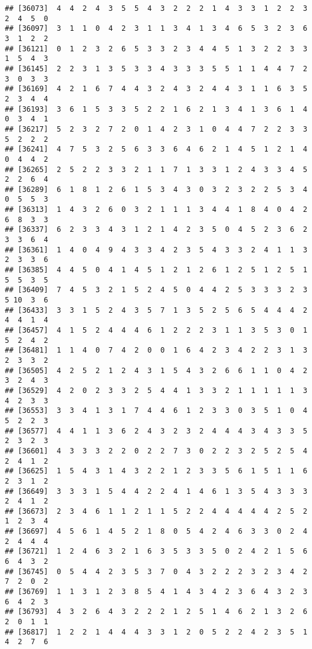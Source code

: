 \documentclass[
]{article}
\begin{document}
\begin{verbatim}
## [36073]  4  4  2  4  3  5  5  4  3  2  2  2  1  4  3  3  1  2  2  3  2  4  5  0
## [36097]  3  1  1  0  4  2  3  1  1  3  4  1  3  4  6  5  3  2  3  6  3  1  2  2
## [36121]  0  1  2  3  2  6  5  3  3  2  3  4  4  5  1  3  2  2  3  3  1  5  4  3
## [36145]  2  2  3  1  3  5  3  3  4  3  3  3  5  5  1  1  4  4  7  2  3  0  3  3
## [36169]  4  2  1  6  7  4  4  3  2  4  3  2  4  4  3  1  1  6  3  5  2  3  4  4
## [36193]  3  6  1  5  3  3  5  2  2  1  6  2  1  3  4  1  3  6  1  4  0  3  4  1
## [36217]  5  2  3  2  7  2  0  1  4  2  3  1  0  4  4  7  2  2  3  3  5  2  2  2
## [36241]  4  7  5  3  2  5  6  3  3  6  4  6  2  1  4  5  1  2  1  4  0  4  4  2
## [36265]  2  5  2  2  3  3  2  1  1  7  1  3  3  1  2  4  3  3  4  5  2  2  6  4
## [36289]  6  1  8  1  2  6  1  5  3  4  3  0  3  2  3  2  2  5  3  4  0  5  5  3
## [36313]  1  4  3  2  6  0  3  2  1  1  1  3  4  4  1  8  4  0  4  2  6  8  3  3
## [36337]  6  2  3  3  4  3  1  2  1  4  2  3  5  0  4  5  2  3  6  2  3  3  6  4
## [36361]  1  4  0  4  9  4  3  3  4  2  3  5  4  3  3  2  4  1  1  3  2  3  3  6
## [36385]  4  4  5  0  4  1  4  5  1  2  1  2  6  1  2  5  1  2  5  1  5  5  3  5
## [36409]  7  4  5  3  2  1  5  2  4  5  0  4  4  2  5  3  3  3  2  3  5 10  3  6
## [36433]  3  3  1  5  2  4  3  5  7  1  3  5  2  5  6  5  4  4  4  2  4  4  1  4
## [36457]  4  1  5  2  4  4  4  6  1  2  2  2  3  1  1  3  5  3  0  1  5  2  4  2
## [36481]  1  1  4  0  7  4  2  0  0  1  6  4  2  3  4  2  2  3  1  3  2  3  3  2
## [36505]  4  2  5  2  1  2  4  3  1  5  4  3  2  6  6  1  1  0  4  2  3  2  4  3
## [36529]  4  2  0  2  3  3  2  5  4  4  1  3  3  2  1  1  1  1  1  3  4  2  3  3
## [36553]  3  3  4  1  3  1  7  4  4  6  1  2  3  3  0  3  5  1  0  4  5  2  2  3
## [36577]  4  4  1  1  3  6  2  4  3  2  3  2  4  4  4  3  4  3  3  5  2  3  2  3
## [36601]  4  3  3  3  2  2  0  2  2  7  3  0  2  2  3  2  5  2  5  4  2  4  1  2
## [36625]  1  5  4  3  1  4  3  2  2  1  2  3  3  5  6  1  5  1  1  6  2  3  1  2
## [36649]  3  3  3  1  5  4  4  2  2  4  1  4  6  1  3  5  4  3  3  3  2  4  1  2
## [36673]  2  3  4  6  1  1  2  1  1  5  2  2  4  4  4  4  4  2  5  2  1  2  3  4
## [36697]  4  5  6  1  4  5  2  1  8  0  5  4  2  4  6  3  3  0  2  4  2  4  4  4
## [36721]  1  2  4  6  3  2  1  6  3  5  3  3  5  0  2  4  2  1  5  6  6  4  3  2
## [36745]  0  5  4  4  2  3  5  3  7  0  4  3  2  2  2  3  2  3  4  2  7  2  0  2
## [36769]  1  1  3  1  2  3  8  5  4  1  4  3  4  2  3  6  4  3  2  3  6  4  2  3
## [36793]  4  3  2  6  4  3  2  2  2  1  2  5  1  4  6  2  1  3  2  6  2  0  1  1
## [36817]  1  2  2  1  4  4  4  3  3  1  2  0  5  2  2  4  2  3  5  1  4  2  7  6

\end{verbatim}
\end{document}
